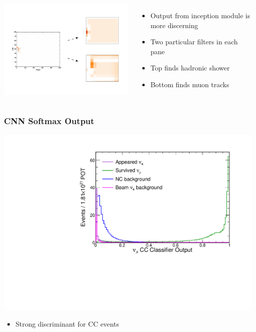 \documentclass[10pt,professionalfonts,xcolor=table]{beamer}
\begin{document}
\begin{frame}
\begin{columns}[t]
\includegraphics[width=1\textwidth,viewport=10 13 170 115, clip=true]{figures/cnn/featurePlotNC}
\gap
\gap
\begin{itemize}
\item Output from inception module is more discerning
\item Two particular filters in each pane
\item Top finds hadronic shower
\item Bottom finds muon tracks
\end{itemize}


\end{columns}
\end{frame}


\begin{frame}

\frametitle{CNN Softmax Output}

  \begin{center}
\includegraphics[height=0.7\textwidth, angle=-90]{figures/cnn/numu_pid_dist.pdf}

  \end{center}
  \begin{itemize}
  \item Strong discriminant for \numu CC events
  \end{itemize}
\end{frame}
\end{document}
